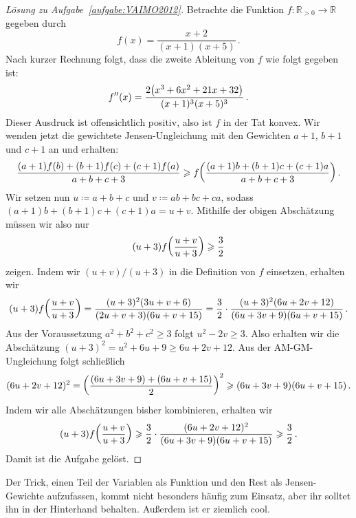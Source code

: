 \begin{proof}[Lösung zu Aufgabe~\ref{aufgabe:VAIMO2012}]
	Betrachte die Funktion $f\colon \mathbb R_{>0}\rightarrow \mathbb R$ gegeben durch
	\begin{equation*}
		f(x)=\frac{x+2}{(x+1)(x+5)}\,.
	\end{equation*}
	Nach kurzer Rechnung folgt, dass die zweite Ableitung von $f$ wie folgt gegeben ist:
	\begin{equation*}
		f''(x)=\frac{2\parens*{x^3+6x^2+21x+32}}{(x+1)^3(x+5)^3}\,.
	\end{equation*}
	Dieser Ausdruck ist offensichtlich positiv, also ist $f$ in der Tat konvex. Wir wenden jetzt die gewichtete Jensen-Ungleichung mit den Gewichten $a+1$, $b+1$ und $c+1$ an und erhalten:
	\begin{equation*}
		\frac{(a+1)f(b)+(b+1)f(c)+(c+1)f(a)}{a+b+c+3}\geqslant f\parens*{\frac{(a+1)b+(b+1)c+(c+1)a}{a+b+c+3}}\,.
	\end{equation*}
	Wir setzen nun $u\coloneqq a+b+c$ und $v\coloneqq ab+bc+ca$, sodass $(a+1)b+(b+1)c+(c+1)a=u+v$. Mithilfe der obigen Abschätzung müssen wir also nur
	\begin{equation*}
		(u+3)f\parens*{\frac{u+v}{u+3}}\geqslant\frac32
	\end{equation*}
	zeigen. Indem wir $(u+v)/(u+3)$ in die Definition von $f$ einsetzen, erhalten wir
	\begin{equation*}
		(u+3)f\parens*{\frac{u+v}{u+3}}=\frac{(u+3)^2(3u+v+6)}{(2u+v+3)(6u+v+15)}=\frac32\cdot \frac{(u+3)^2(6u+2v+12)}{(6u+3v+9)(6u+v+15)}\,.
	\end{equation*}
	Aus der Voraussetzung $a^2+b^2+c^2\geqslant 3$ folgt $u^2-2v\geqslant 3$. Also erhalten wir die Abschätzung $(u+3)^2=u^2+6u+9\geqslant 6u+2v+12$. Aus der AM-GM-Ungleichung folgt schließlich
	\begin{equation*}
		(6u+2v+12)^2=\parens*{\frac{(6u+3v+9)+(6u+v+15)}{2}}^2\geqslant (6u+3v+9)(6u+v+15)\,.
	\end{equation*}
	Indem wir alle Abschätzungen bisher kombinieren, erhalten wir
	\begin{equation*}
		(u+3)f\parens*{\frac{u+v}{u+3}}\geqslant \frac32\cdot \frac{(6u+2v+12)^2}{(6u+3v+9)(6u+v+15)}\geqslant \frac32\,.
	\end{equation*}
	Damit ist die Aufgabe gelöst.
\end{proof}
Der Trick, einen Teil der Variablen als Funktion und den Rest als Jensen-Gewichte aufzufassen, kommt nicht besonders häufig zum Einsatz, aber ihr solltet ihn in der Hinterhand behalten. Außerdem ist er ziemlich cool.
